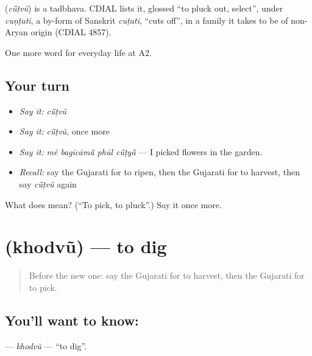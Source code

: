 \begin{cousinweb}
\textbf{} (\emph{cū̃ṭvũ}) is a tadbhava. CDIAL lists it, glossed \textquotedblleft{}to pluck out, select\textquotedblright{}, under \emph{cuṇṭati}, a by-form of Sanskrit \emph{cuṭati}, \textquotedblleft{}cuts off\textquotedblright{}, in a family it takes to be of non-Aryan origin (CDIAL 4857).
\end{cousinweb}

\begin{grammarlens}[title={What you've built}]
One more word for everyday life at A2.
\end{grammarlens}

\subsection*{Your turn}
\begin{itemize}
\raggedright
  \item \emph{Say it:} \emph{cū̃ṭvũ}
  \item \emph{Say it:} \emph{cū̃ṭvũ}, once more
  \item \emph{Say it:} \emph{mẽ bagīcāmā̃ phūl cū̃ṭyā̃} — I picked flowers in the garden.
  \item \emph{Recall:} say the Gujarati for to ripen, then the Gujarati for to harvest, then say \emph{cū̃ṭvũ} again
\end{itemize}

\begin{tcolorbox}[breakable,colback=teal!4,colframe=teal!35!black,title={Before you move on}]
What does  mean? (\textquotedblleft{}To pick, to pluck\textquotedblright{}.) Say it once more.
\end{tcolorbox}
\section[\texorpdfstring{\gu{ખોદવું} (khodvũ)}{ખોદવું (khodvũ)}]{ (khodvũ) — to dig}

\label{lesson:GU-C242-khodvu}



\begin{quote}
Before the new one: say the Gujarati for to harvest, then the Gujarati for to pick.
\end{quote}

\subsection*{You'll want to know: }
\textbf{} — \emph{khodvũ} — \textquotedblleft{}to dig\textquotedblright{}.

